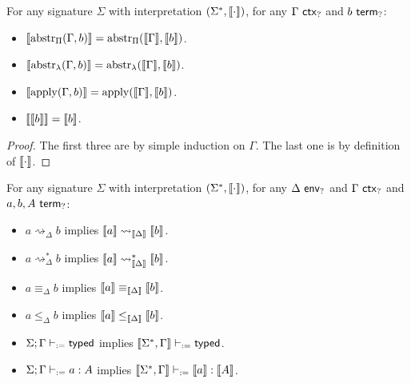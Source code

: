 \documentclass[twoside]{report}
\begin{document}
\begin{proposition}
\label{thm:hole_interpretation_across_abstr_apply}
For any signature $\Sigma$ with interpretation $(\Sigma^\ast, \llbracket{\cdot}\rrbracket)$, for any $\Gamma \ \mathsf{ctx}_{?}$ and $b \ \mathsf{term}_{?}$:
\begin{itemize}[noitemsep]
    \item $\llbracket{\operatorname{abstr}_\Pi(\Gamma, b)}\rrbracket = \operatorname{abstr}_\Pi(\llbracket{\Gamma}\rrbracket, \llbracket{b}\rrbracket)$.
    \item $\llbracket{\operatorname{abstr}_\lambda(\Gamma, b)}\rrbracket = \operatorname{abstr}_\lambda(\llbracket{\Gamma}\rrbracket, \llbracket{b}\rrbracket)$.
    \item $\llbracket{\operatorname{apply}(\Gamma, b)}\rrbracket = \operatorname{apply}(\llbracket{\Gamma}\rrbracket, \llbracket{b}\rrbracket)$.
    \item $\llbracket{\llbracket{b}\rrbracket}\rrbracket = \llbracket{b}\rrbracket$.
\end{itemize}
\end{proposition}

\begin{proof}
The first three are by simple induction on $\Gamma$. The last one is by definition of $\llbracket{\cdot}\rrbracket$.
\end{proof}

\begin{proposition}[Soundness]
\label{thm:hole_interpretation_soundness}
For any signature $\Sigma$ with interpretation $(\Sigma^\ast, \llbracket{\cdot}\rrbracket)$, for any $\Delta \ \mathsf{env}_{?}$ and $\Gamma \ \mathsf{ctx}_{?}$ and $a, b, A \ \mathsf{term}_{?}$:
\begin{itemize}[noitemsep]
    \item $a \rightsquigarrow_\Delta b$ implies $\llbracket{a}\rrbracket \rightsquigarrow_{\llbracket{\Delta}\rrbracket} \llbracket{b}\rrbracket$.
    \item $a \rightsquigarrow_\Delta^\ast b$ implies $\llbracket{a}\rrbracket \rightsquigarrow_{\llbracket{\Delta}\rrbracket}^\ast \llbracket{b}\rrbracket$.
    \item $a \equiv_\Delta b$ implies $\llbracket{a}\rrbracket \equiv_{\llbracket{\Delta}\rrbracket} \llbracket{b}\rrbracket$.
    \item $a \leq_\Delta b$ implies $\llbracket{a}\rrbracket \leq_{\llbracket{\Delta}\rrbracket} \llbracket{b}\rrbracket$.
    \item $\Sigma; \Gamma \vdash_{:=} \mathsf{typed}$ implies $\llbracket{\Sigma^\ast, \Gamma}\rrbracket \vdash_{:=} \mathsf{typed}$.
    \item $\Sigma; \Gamma \vdash_{:=} a : A$ implies $\llbracket{\Sigma^\ast, \Gamma}\rrbracket \vdash_{:=} \llbracket{a}\rrbracket : \llbracket{A}\rrbracket$.
\end{itemize}
\end{proposition}
\end{document}
